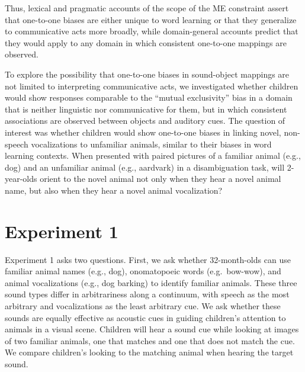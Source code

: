 \documentclass[english,floatsintext,man]{apa6}
\theoremstyle{definition}
\theoremstyle{definition}
\theoremstyle{definition}
\theoremstyle{remark}
\begin{document}
Thus, lexical and pragmatic accounts of the scope of the ME constraint
assert that one-to-one biases are either unique to word learning or that
they generalize to communicative acts more broadly, while domain-general
accounts predict that they would apply to any domain in which consistent
one-to-one mappings are observed.

To explore the possibility that one-to-one biases in sound-object
mappings are not limited to interpreting communicative acts, we
investigated whether children would show responses comparable to the
\enquote{mutual exclusivity} bias in a domain that is neither linguistic
nor communicative for them, but in which consistent associations are
observed between objects and auditory cues. The question of interest was
whether children would show one-to-one biases in linking novel,
non-speech vocalizations to unfamiliar animals, similar to their biases
in word learning contexts. When presented with paired pictures of a
familiar animal (e.g., dog) and an unfamiliar animal (e.g., aardvark) in
a disambiguation task, will 2-year-olds orient to the novel animal not
only when they hear a novel animal name, but also when they hear a novel
animal vocalization?

\section{Experiment 1}\label{experiment-1}

Experiment 1 asks two questions. First, we ask whether 32-month-olds can
use familiar animal names (e.g., dog), onomatopoeic words
(e.g.~bow-wow), and animal vocalizations (e.g., dog barking) to identify
familiar animals. These three sound types differ in arbitrariness along
a continuum, with speech as the most arbitrary and vocalizations as the
least arbitrary cue. We ask whether these sounds are equally effective
as acoustic cues in guiding children's attention to animals in a visual
scene. Children will hear a sound cue while looking at images of two
familiar animals, one that matches and one that does not match the cue.
We compare children's looking to the matching animal when hearing the
target sound.
\end{document}
